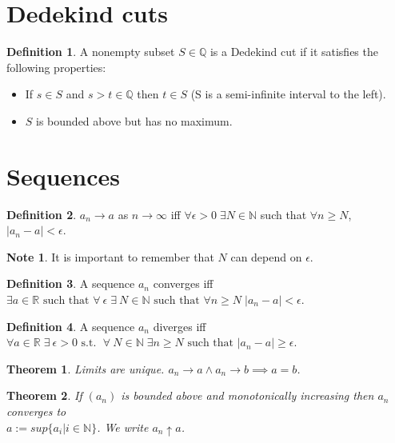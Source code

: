 \documentclass[11pt,a4paper]{article}
\newcommand\Q{\mathbb{Q}}
\newcommand\R{\mathbb{R}}
\newcommand\N{\mathbb{N}}
\newtheorem{theorem}{Theorem}
\theoremstyle{definition}
\newtheorem{definition}{Definition}
\newtheorem{note}{Note}
\begin{document}
\section{Dedekind cuts}

\begin{definition}
    A nonempty subset $ S \in \Q $ is a Dedekind cut if it satisfies the following properties: 
    \begin{itemize}
        \item If $ s \in S $ and $ s > t \in \Q $ then $ t \in S $ (S is a semi-infinite interval to the left).
        \item $ S $ is bounded above but has no maximum.
    \end{itemize}
\end{definition}

\section{Sequences}

\begin{definition}
    $ a_n \to a $ as $ n \to \infty $ iff $ \forall \epsilon > 0 \; \exists N \in \N $ such that $\forall n \geq N$, $|a_n - a| < \epsilon$.
\end{definition}

\begin{note}
    It is important to remember that $ N $ can depend on $ \epsilon $.
\end{note}

\begin{definition}
    A sequence $ a_n $ converges iff $\exists a \in \R \text{ such that } \forall \: \epsilon \; \exists \: N \in \N \text{ such that } \forall n \geq N \; |a_n - a| < \epsilon$.
\end{definition}

\begin{definition}
    A sequence $ a_n $ diverges iff $\forall a \in \R \; \exists \: \epsilon > 0 \text{ s.t. } \; \forall \: N \in \N \; \exists n \geq N \text{ such that } |a_n - a| \geq \epsilon$.
\end{definition}

\begin{theorem}
    Limits are unique. $ a_n \to a \land a_n \to b \implies a = b$.
\end{theorem}

\begin{theorem}
    If $(a_n)$ is bounded above and monotonically increasing then $ a_n $ converges to \\ $ a := sup\{a_i | i \in \N \} $. We write $ a_n \uparrow a $. 
\end{theorem}
\end{document}
